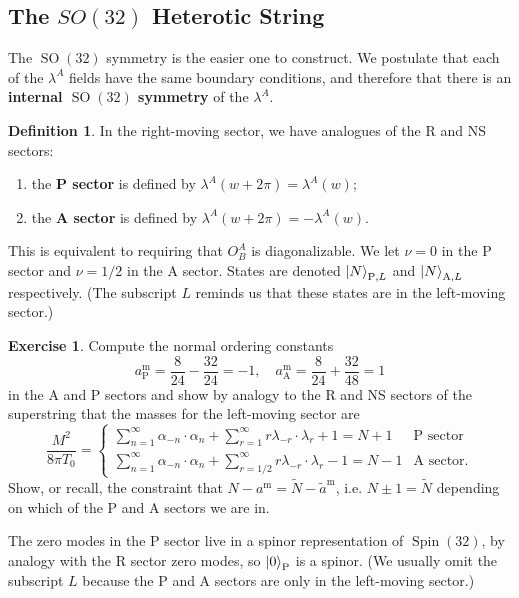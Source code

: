\documentclass{report}
\theoremstyle{plain}
\theoremstyle{definition}
\newtheorem{definition}[theorem]{Definition}
\newtheorem{exercise}{Exercise}[section]
\theoremstyle{remark}
\DeclareMathOperator{\SO}{SO}
\DeclareMathOperator{\Spin}{Spin}
\begin{document}
\subsection{The $SO(32)$ Heterotic String}

The $\SO(32)$ symmetry is the easier one to construct. We postulate
that each of the $\lambda^A$ fields have the same boundary conditions,
and therefore that there is an {\bf internal $\SO(32)$ symmetry} of
the $\lambda^A$.

\begin{definition}
  In the right-moving sector, we have analogues of the R and NS sectors:
  \begin{enumerate}
  \item the {\bf P sector} is defined by $\lambda^A(w + 2\pi) =
    \lambda^A(w)$;
  \item the {\bf A sector} is defined by $\lambda^A(w + 2\pi) =
    -\lambda^A(w)$.
  \end{enumerate}
  This is equivalent to requiring that $O^A_B$ is diagonalizable. We
  let $\nu = 0$ in the P sector and $\nu = 1/2$ in the A sector.
  States are denoted $\ket{N}_{\text{P},L}$ and $\ket{N}_{\text{A},L}$
  respectively. (The subscript $L$ reminds us that these states are in
  the left-moving sector.)
\end{definition}

\begin{exercise}
  Compute the normal ordering constants
  \[ a^{\text{m}}_{\text{P}} = \frac{8}{24} - \frac{32}{24} = -1, \quad a^{\text{m}}_{\text{A}} = \frac{8}{24} + \frac{32}{48} = 1 \]
  in the A and P sectors and show by analogy to the R and NS sectors
  of the superstring that the masses for the left-moving sector are
  \[ \frac{M^2}{8\pi T_0} = \begin{cases} \sum_{n=1}^\infty \alpha_{-n} \cdot \alpha_n + \sum_{r=1}^\infty r \lambda_{-r} \cdot \lambda_r + 1 = N + 1 & \text{P sector} \\ \sum_{n=1}^\infty \alpha_{-n} \cdot \alpha_n + \sum_{r=1/2}^\infty r \lambda_{-r} \cdot \lambda_r - 1 = N - 1 & \text{A sector}. \end{cases} \]
  Show, or recall, the constraint that $N - a^{\text{m}} = \tilde{N} -
  \tilde{a}^{\text{m}}$, i.e. $N \pm 1 = \tilde{N}$ depending on which
  of the P and A sectors we are in.
\end{exercise}

The zero modes in the P sector live in a spinor representation of
$\Spin(32)$, by analogy with the R sector zero modes, so
$\ket{0}_{\text{P}}$ is a spinor. (We usually omit the subscript $L$
because the P and A sectors are only in the left-moving sector.)
\end{document}
